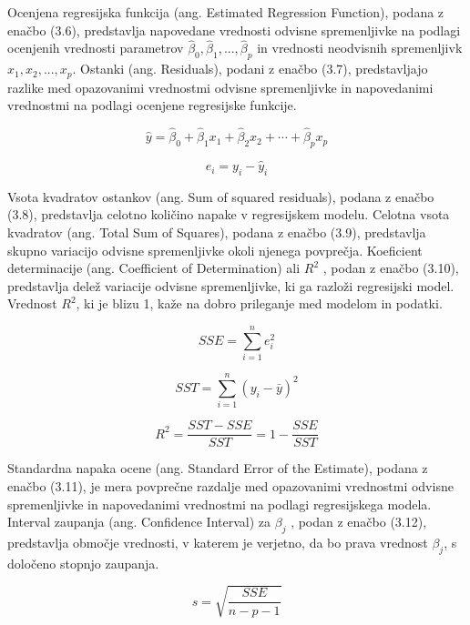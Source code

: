 \documentclass[a4paper,12pt,openright]{book}
\begin{document}
Ocenjena regresijska funkcija (ang. Estimated Regression Function), podana z enačbo (3.6), predstavlja napovedane vrednosti odvisne spremenljivke na podlagi ocenjenih vrednosti parametrov $\hat{\beta}_0, \hat{\beta}_1, ..., \hat{\beta}_p$ in vrednosti neodvisnih spremenljivk $x_1, x_2, ..., x_p$. Ostanki (ang. Residuals), podani z enačbo (3.7), predstavljajo razlike med opazovanimi vrednostmi odvisne spremenljivke in napovedanimi vrednostmi na podlagi ocenjene regresijske funkcije.

\begin{equation}
\hat{y} = \hat{\beta}_0 + \hat{\beta}_1 x_1 + \hat{\beta}_2 x_2 + \cdots + \hat{\beta}_p x_p
\end{equation}

\begin{equation}
e_i = y_i - \hat{y}_i
\end{equation}

Vsota kvadratov ostankov (ang. Sum of squared residuals), podana z enačbo (3.8), predstavlja celotno količino napake v regresijskem modelu. Celotna vsota kvadratov (ang. Total Sum of Squares), podana z enačbo (3.9), predstavlja skupno variacijo odvisne spremenljivke okoli njenega povprečja. Koeficient determinacije (ang. Coefficient of Determination) ali $R^2$ , podan z enačbo (3.10), predstavlja delež variacije odvisne spremenljivke, ki ga razloži regresijski model. Vrednost $R^2$, ki je blizu 1, kaže na dobro prileganje med modelom in podatki.


\begin{equation}
SSE = \sum_{i=1}^{n} e_i^2
\end{equation}

\begin{equation}
SST = \sum_{i=1}^{n} \left(y_i - \bar{y}\right)^2
\end{equation}

\begin{equation}
R^2 = \frac{SST - SSE}{SST} = 1 - \frac{SSE}{SST}
\end{equation}


Standardna napaka ocene (ang. Standard Error of the Estimate), podana z enačbo (3.11), je mera povprečne razdalje med opazovanimi vrednostmi odvisne spremenljivke in napovedanimi vrednostmi na podlagi regresijskega modela. Interval zaupanja (ang. Confidence Interval) za $\beta_j$ , podan z enačbo (3.12), predstavlja območje vrednosti, v katerem je verjetno, da bo prava vrednost $\beta_j$, s določeno stopnjo zaupanja.

\begin{equation}
s = \sqrt{\frac{SSE}{n - p - 1}}
\end{equation}
\end{document}
